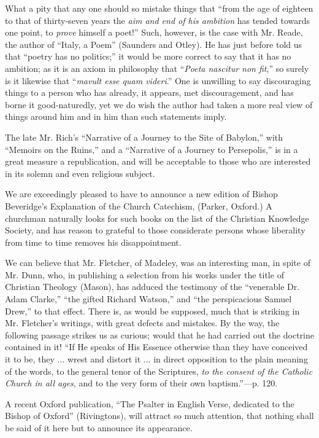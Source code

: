 What a pity that any one should so mistake things
that ``from the age of eighteen to that of thirty-seven years the \emph{aim
and end of his ambition} has tended towards one point, to \emph{prove}
himself a poet!'' Such, however, is the case with Mr. Reade, the author
of ``Italy, a Poem'' (Saunders and Otley). He has just before told us that
``poetry has no politics;'' it would be more correct to say that it has no
ambition; as it is an axiom in philosophy that ``\emph{Poeta nascitur non
fit},'' so surely is it likewise that ``\emph{mavult esse quam videri}.''
One is unwilling to say discouraging things to a person who has already,
it appears, met discouragement, and has borne it good-naturedly, yet we
do wish the author had taken a more real view of things around him and
in him than such statements imply.

The late Mr. Rich's ``Narrative of a Journey to the
Site of Babylon,'' with ``Memoirs on the Ruins,'' and a ``Narrative of a
Journey to Persepolis,'' is in a great measure a republication, and
will be acceptable to those who are interested in its solemn and even
religious subject.

We are exceedingly pleased to have to announce a
new edition of Bishop Beveridge's Explanation of the Church Catechism,
(Parker, Oxford.) A churchman naturally looks for such books on the list
of the Christian Knowledge Society, and has reason to grateful to those
considerate persons whose liberality from time to time removes his
disappointment.

We can believe that Mr. Fletcher, of Madeley, was
an interesting man, in spite of Mr. Dunn, who, in publishing a selection
from his works under the title of Christian Theology (Mason), has
adduced the testimony of the ``venerable Dr. Adam Clarke,'' ``the gifted
Richard Watson,'' and ``the perspicacious Samuel Drew,'' to that effect.
There is, as would be supposed, much that is striking in Mr. Fletcher's
writings, with great defects and mistakes. By the way, the following
passage strikes us as curious; would that he had carried out the
doctrine contained in it! ``If He speaks of His Essence otherwise than
they have conceived it to be, they ... wrest and distort it ... in
direct opposition to the plain meaning of the words, to the general
tenor of the Scriptures, \emph{to the consent of the Catholic Church in all
ages}, and to the very form of their own baptism.''—p. 120.

A recent Oxford publication, ``The Psalter in
English Verse, dedicated to the Bishop of Oxford'' (Rivingtons), will
attract so much attention, that nothing shall be said of it here but to
announce its appearance.

